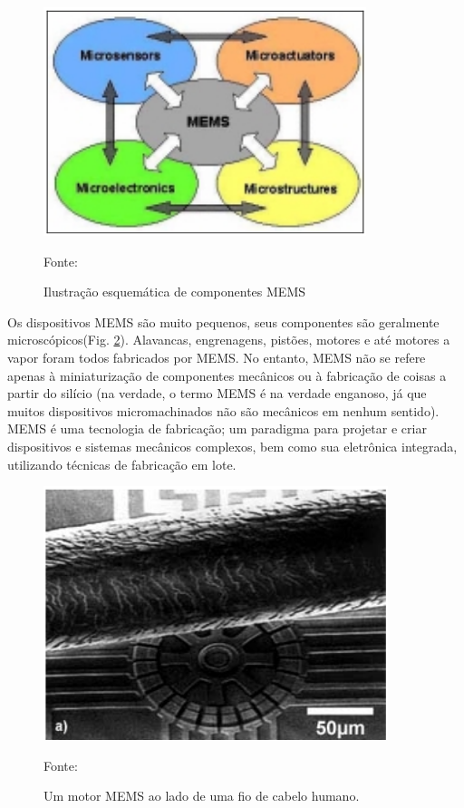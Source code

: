\begin{figure}[h]
	\centering
	\includegraphics[keepaspectratio=true,scale=0.5
	]{figuras/esquematico_mems.png}
	\caption{Ilustração esquemática de componentes MEMS}
	Fonte: \cite{prime2002}
	\label{esquematico_mems}
\end{figure}

Os dispositivos MEMS são muito pequenos, seus componentes são geralmente microscópicos(Fig. \ref{escala_mems}). Alavancas, engrenagens, pistões, motores e até motores a vapor foram todos fabricados por MEMS. No entanto, MEMS não se refere apenas à miniaturização de componentes mecânicos ou à fabricação de coisas a partir do silício (na verdade, o termo MEMS é na verdade enganoso, já que muitos dispositivos micromachinados não são mecânicos em nenhum sentido). MEMS é uma tecnologia de fabricação; um paradigma para projetar e criar dispositivos e sistemas mecânicos complexos, bem como sua eletrônica integrada, utilizando técnicas de fabricação em lote\cite{prime2002}.

\begin{figure}[h]
	\centering
	\includegraphics[keepaspectratio=true,scale=0.5
	]{figuras/escala_mems.png}
	\caption{Um motor MEMS ao lado de uma fio de cabelo humano.}
	Fonte: \cite{prime2002}
	\label{escala_mems}
\end{figure}

